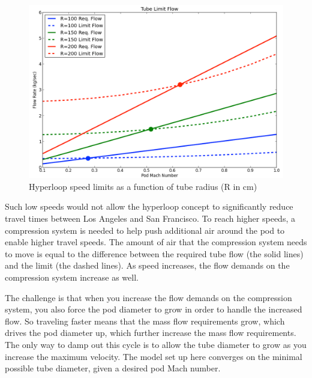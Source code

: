 \documentclass[heading.tex]{subfiles}
\begin{document}
\begin{figure}[hbtp]
\centering
\includegraphics[scale=0.5]{images/tube_flow_limits.png}
\caption{Hyperloop speed limits as a function of tube radius (R in cm)}
\label{f:flowLIMIT}
\end{figure}

Such low speeds would not allow the hyperloop concept to significantly reduce travel times between Los Angeles and San Francisco. To
reach higher speeds, a compression system is needed to help push additional air around the pod to enable higher travel speeds. The amount
of air that the compression system needs to move is equal to the difference between the required tube flow (the solid lines) and the limit
(the dashed lines). As speed increases, the flow demands on the compression system increase as well.

The challenge is that when you increase the flow demands on the compression system, you also force the pod diameter to grow in order to
handle the increased flow. So traveling faster means that the mass flow requirements grow, which drives the pod diameter up, which further
increase the mass flow requirements. The only way to damp out this cycle is to allow the tube diameter to grow as you increase the
maximum velocity. The model set up here converges on the minimal possible tube diameter, given a desired pod Mach number.
\end{document}
